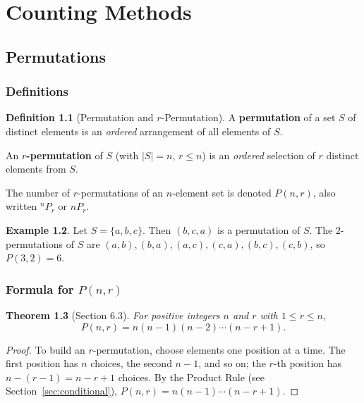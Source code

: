 \documentclass[11pt, a4paper, notitlepage]{report}
\newtheorem{theorem}{Theorem}[section]
\theoremstyle{definition}
\newtheorem{definition}[theorem]{Definition}
\newtheorem{example}[theorem]{Example}
\theoremstyle{remark}
\begin{document}
\chapter{Counting Methods}
\label{chap:counting-methods}

\section{Permutations}
\label{sec:permutations}

\subsection{Definitions}

\begin{definition}[Permutation and $r$-Permutation]
\label{def:r-perm}
A \textbf{permutation} of a set $S$ of distinct elements is an \emph{ordered} arrangement of
all elements of $S$.

An \textbf{$r$-permutation} of $S$ (with $|S| = n$, $r \leq n$) is an \emph{ordered} selection
of $r$ distinct elements from $S$.

The number of $r$-permutations of an $n$-element set is denoted $P(n,r)$, also written
${}^n P_r$ or $nP_r$.
\end{definition}

\begin{example}
Let $S = \{a, b, c\}$. Then $(b, c, a)$ is a permutation of $S$. The $2$-permutations of $S$
are $(a,b),(b,a),(a,c),(c,a),(b,c),(c,b)$, so $P(3,2) = 6$.
\end{example}

\subsection{Formula for $P(n,r)$}

\begin{theorem}[Section 6.3]
\label{thm:pnr}
For positive integers $n$ and $r$ with $1 \leq r \leq n$,
\[
  P(n,r) = n(n-1)(n-2)\cdots(n-r+1).
\]
\end{theorem}

\begin{proof}
To build an $r$-permutation, choose elements one position at a time. The first position has $n$
choices, the second $n-1$, and so on; the $r$-th position has $n-(r-1) = n-r+1$ choices.
By the Product Rule (see Section~\ref{sec:conditional}),
$P(n,r) = n(n-1)\cdots(n-r+1)$.
\end{proof}
\end{document}
